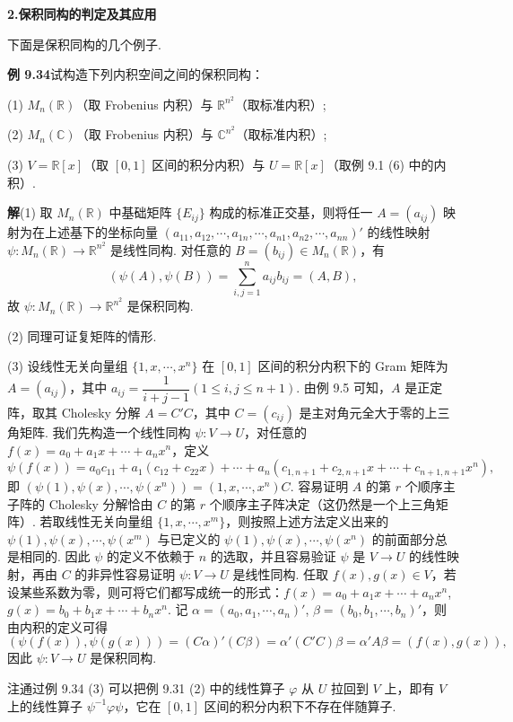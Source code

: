 \documentclass[UTF8,12pt,a4paper,fontset=fandol]{ctexart}
\begin{document}
\noindent\textbf{2.\quad 保积同构的判定及其应用}

下面是保积同构的几个例子.

\noindent\textbf{例 9.34}\quad 试构造下列内积空间之间的保积同构：

(1) $M_n(\mathbb{R})$（取 Frobenius 内积）与 $\mathbb{R}^{n^2}$（取标准内积）;

(2) $M_n(\mathbb{C})$（取 Frobenius 内积）与 $\mathbb{C}^{n^2}$（取标准内积）;

(3) $V=\mathbb{R}[x]$（取 $[0,1]$ 区间的积分内积）与 $U=\mathbb{R}[x]$（取例 9.1 (6) 中的内积）.

\noindent\textbf{解}\quad (1) 取 $M_n(\mathbb{R})$ 中基础矩阵 $\{E_{ij}\}$ 构成的标准正交基，则将任一 $A=(a_{ij})$ 映射为在上述基下的坐标向量 $(a_{11},a_{12},\cdots,a_{1n},\cdots,a_{n1},a_{n2},\cdots,a_{nn})'$ 的线性映射 $\psi:M_n(\mathbb{R})\to\mathbb{R}^{n^2}$ 是线性同构. 对任意的 $B=(b_{ij})\in M_n(\mathbb{R})$，有
\[
(\psi(A),\psi(B))=\sum_{i,j=1}^n a_{ij}b_{ij}=(A,B),
\]
故 $\psi:M_n(\mathbb{R})\to\mathbb{R}^{n^2}$ 是保积同构.

(2) 同理可证复矩阵的情形.

(3) 设线性无关向量组 $\{1,x,\cdots,x^n\}$ 在 $[0,1]$ 区间的积分内积下的 Gram 矩阵为 $A=(a_{ij})$，其中 $a_{ij}=\dfrac1{i+j-1}(1\le i,j\le n+1)$. 由例 9.5 可知，$A$ 是正定阵，取其 Cholesky 分解 $A=C'C$，其中 $C=(c_{ij})$ 是主对角元全大于零的上三角矩阵. 我们先构造一个线性同构 $\psi:V\to U$，对任意的 $f(x)=a_0+a_1x+\cdots+a_nx^n$，定义
\[
\psi(f(x))=a_0c_{11}+a_1(c_{12}+c_{22}x)+\cdots+a_n(c_{1,n+1}+c_{2,n+1}x+\cdots+c_{n+1,n+1}x^n),
\]
即 $(\psi(1),\psi(x),\cdots,\psi(x^n))=(1,x,\cdots,x^n)C$. 容易证明 $A$ 的第 $r$ 个顺序主子阵的 Cholesky 分解恰由 $C$ 的第 $r$ 个顺序主子阵决定（这仍然是一个上三角矩阵）. 若取线性无关向量组 $\{1,x,\cdots,x^m\}$，则按照上述方法定义出来的 $\psi(1),\psi(x),\cdots,\psi(x^m)$ 与已定义的 $\psi(1),\psi(x),\cdots,\psi(x^n)$ 的前面部分总是相同的. 因此 $\psi$ 的定义不依赖于 $n$ 的选取，并且容易验证 $\psi$ 是 $V\to U$ 的线性映射，再由 $C$ 的非异性容易证明 $\psi:V\to U$ 是线性同构. 任取 $f(x),g(x)\in V$，若设某些系数为零，则可将它们都写成统一的形式：$f(x)=a_0+a_1x+\cdots+a_nx^n$, $g(x)=b_0+b_1x+\cdots+b_nx^n$. 记 $\alpha=(a_0,a_1,\cdots,a_n)'$, $\beta=(b_0,b_1,\cdots,b_n)'$，则由内积的定义可得
\[
(\psi(f(x)),\psi(g(x)))=(C\alpha)'(C\beta)=\alpha'(C'C)\beta=\alpha'A\beta=(f(x),g(x)),
\]
因此 $\psi:V\to U$ 是保积同构.

注\quad 通过例 9.34 (3) 可以把例 9.31 (2) 中的线性算子 $\varphi$ 从 $U$ 拉回到 $V$ 上，即有 $V$ 上的线性算子 $\psi^{-1}\varphi\psi$，它在 $[0,1]$ 区间的积分内积下不存在伴随算子.
\end{document}
